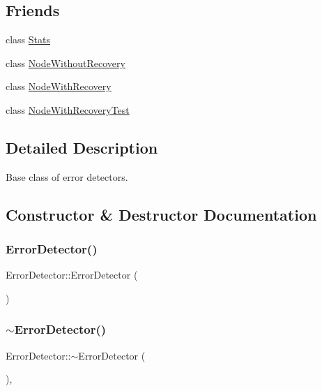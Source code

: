 \subsection*{Friends}
\begin{DoxyCompactItemize}
\item 
class \hyperlink{class_error_detector_a129f65b6976377739eb6231b6962985e}{Stats}
\item 
class \hyperlink{class_error_detector_aa0495b79e94b09962892b921ae370e57}{Node\+Without\+Recovery}
\item 
class \hyperlink{class_error_detector_af62fbc8632478613aa92b0e55c79510e}{Node\+With\+Recovery}
\item 
class \hyperlink{class_error_detector_a4a759c82473f06c7e89c3d75a509a390}{Node\+With\+Recovery\+Test}
\end{DoxyCompactItemize}


\subsection{Detailed Description}
Base class of error detectors. 

\subsection{Constructor \& Destructor Documentation}
\mbox{\label{class_error_detector_ae851a02dff242968cd6419400271d74f}} 
\subsubsection{\texorpdfstring{Error\+Detector()}{ErrorDetector()}}
{\footnotesize\ttfamily Error\+Detector\+::\+Error\+Detector (\begin{DoxyParamCaption}{ }\end{DoxyParamCaption})}

\mbox{\label{class_error_detector_a3708d713f8f7bee01aa7e5a2fb7bb652}} 
\subsubsection{\texorpdfstring{$\sim$\+Error\+Detector()}{~ErrorDetector()}}
{\footnotesize\ttfamily Error\+Detector\+::$\sim$\+Error\+Detector (\begin{DoxyParamCaption}{ }\end{DoxyParamCaption})\hspace{0.3cm}{\ttfamily [pure virtual]}, {\ttfamily [default]}}



